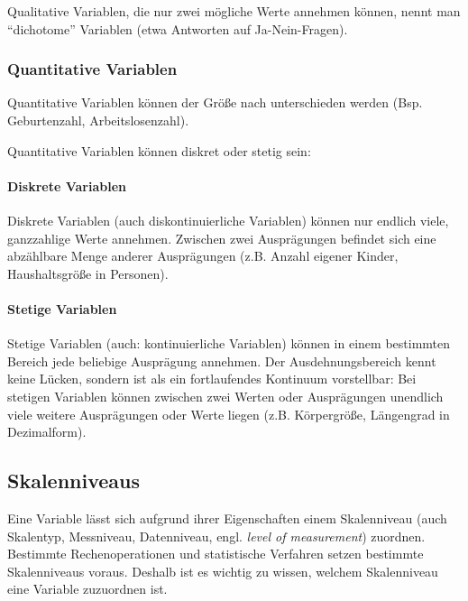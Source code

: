 \documentclass[
  11pt,
  ngerman,
  a4paper,
]{report}
\begin{document}
Qualitative Variablen, die nur zwei mögliche Werte annehmen können, nennt man \enquote{dichotome} Variablen (etwa Antworten auf Ja-Nein-Fragen).

\hypertarget{quantitative-variablen}{%
\subsubsection{Quantitative Variablen}\label{quantitative-variablen}}

Quantitative Variablen können der Größe nach unterschieden werden (Bsp. Geburtenzahl, Arbeitslosenzahl).

Quantitative Variablen können diskret oder stetig sein:

\hypertarget{diskrete-variablen}{%
\paragraph{Diskrete Variablen}\label{diskrete-variablen}}

Diskrete Variablen (auch diskontinuierliche Variablen) können nur endlich viele, ganzzahlige Werte annehmen. Zwischen zwei Ausprägungen befindet sich eine abzählbare Menge anderer Ausprägungen (z.B. Anzahl eigener Kinder, Haushaltsgröße in Personen).

\hypertarget{stetige-variablen}{%
\paragraph{Stetige Variablen}\label{stetige-variablen}}

Stetige Variablen (auch: kontinuierliche Variablen) können in einem bestimmten Bereich jede beliebige Ausprägung annehmen. Der Ausdehnungsbereich kennt keine Lücken, sondern ist als ein fortlaufendes Kontinuum vorstellbar: Bei stetigen Variablen können zwischen zwei Werten oder Ausprägungen unendlich viele weitere Ausprägungen oder Werte liegen (z.B. Körpergröße, Längengrad in Dezimalform).

\hypertarget{skalenniveaus}{%
\subsection{Skalenniveaus}\label{skalenniveaus}}

Eine Variable lässt sich aufgrund ihrer Eigenschaften einem Skalenniveau (auch Skalentyp, Messniveau, Datenniveau, engl. \emph{level of measurement}) zuordnen. Bestimmte Rechenoperationen und statistische Verfahren setzen bestimmte Skalenniveaus voraus. Deshalb ist es wichtig zu wissen, welchem Skalenniveau eine Variable zuzuordnen ist.
\end{document}
